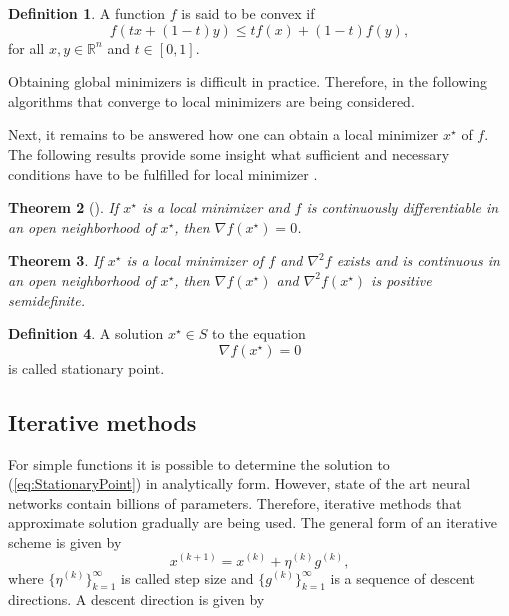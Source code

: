 \documentclass[12pt]{article}
\newtheorem{theorem}{Theorem}[section]
\theoremstyle{definition}
\newtheorem{definition}[theorem]{Definition}
\numberwithin{equation}{section}
\begin{document}
\begin{definition}
  A function $f$ is said to be convex if 
  \begin{equation}
    f(tx+(1-t)y) \leq tf(x)+(1-t)f(y),
  \end{equation}
  for all $x,y \in \mathbb{R}^n$ and $t \in [0,1]$.
\end{definition}
Obtaining global minimizers is difficult in practice. Therefore, in the following algorithms that converge to local minimizers are being considered.

Next, it remains to be answered how one can obtain a local minimizer $x^\star$ of $f$.
The following results provide some insight what sufficient and necessary conditions have to be fulfilled for local minimizer \cite{nocedal1999numerical}.
\begin{theorem}[]
  If $x^\star$ is a local minimizer and $f$ is continuously differentiable in an open neighborhood of $x^\star$, then $\nabla f(x^\star) = 0$.
\end{theorem}
\begin{theorem}
  If $x^\star$ is a local minimizer of $f$ and $\nabla^2 f$ exists and is continuous in an open neighborhood of $x^\star$, then $\nabla f(x^\star)$ and $\nabla^2f(x^\star)$ is positive semidefinite.
\end{theorem}
\begin{definition}
  A solution $x^\star \in S$ to the equation
  \begin{equation}
  \label{eq:StationaryPoint}
    \nabla f(x^\star) = 0
  \end{equation}
  is called stationary point.
\end{definition}
\subsection{Iterative methods}
For simple functions it is possible to determine the solution to (\ref*{eq:StationaryPoint})
in analytically form. However, state of the art neural networks contain billions of parameters. Therefore, iterative methods that approximate solution gradually are being used. The general form of an iterative scheme is given by
\begin{equation}
  x^{(k+1)} = x^{(k)} + \eta^{(k)} g^{(k)},
\end{equation}
where $\{\eta^{(k)}\}_{k=1}^\infty$ is called step size and $\{g^{(k)}\}_{k=1}^\infty$ is a sequence of descent directions. A descent direction is given by 
\end{document}
